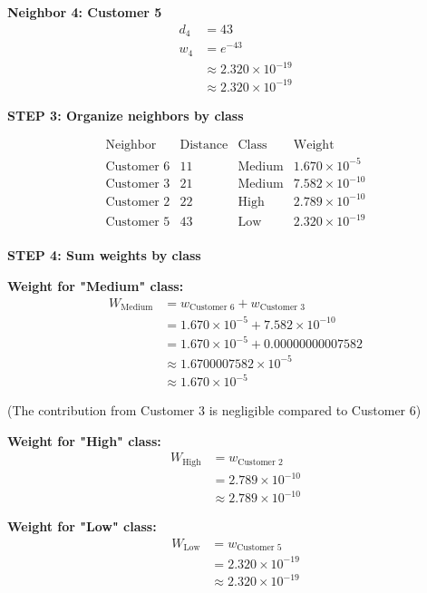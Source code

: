 \documentclass[12pt]{article}
\begin{document}
\begin{solution}
\textbf{Neighbor 4: Customer 5}
\begin{align*}
d_4 &= 43 \\
w_4 &= e^{-43} \\
&\approx 2.320 \times 10^{-19} \\
&\approx \boxed{2.320 \times 10^{-19}}
\end{align*}

\textbf{STEP 3: Organize neighbors by class}

\[
\begin{array}{c|c|c|c}
\text{Neighbor} & \text{Distance} & \text{Class} & \text{Weight} \\
\hline
\text{Customer 6} & 11 & \text{Medium} & 1.670 \times 10^{-5} \\
\text{Customer 3} & 21 & \text{Medium} & 7.582 \times 10^{-10} \\
\text{Customer 2} & 22 & \text{High} & 2.789 \times 10^{-10} \\
\text{Customer 5} & 43 & \text{Low} & 2.320 \times 10^{-19} \\
\end{array}
\]

\textbf{STEP 4: Sum weights by class}

\textbf{Weight for "Medium" class:}
\begin{align*}
W_{\text{Medium}} &= w_{\text{Customer 6}} + w_{\text{Customer 3}} \\
&= 1.670 \times 10^{-5} + 7.582 \times 10^{-10} \\
&= 1.670 \times 10^{-5} + 0.00000000007582 \\
&\approx 1.6700007582 \times 10^{-5} \\
&\approx \boxed{1.670 \times 10^{-5}}
\end{align*}

(The contribution from Customer 3 is negligible compared to Customer 6)

\textbf{Weight for "High" class:}
\begin{align*}
W_{\text{High}} &= w_{\text{Customer 2}} \\
&= 2.789 \times 10^{-10} \\
&\approx \boxed{2.789 \times 10^{-10}}
\end{align*}

\textbf{Weight for "Low" class:}
\begin{align*}
W_{\text{Low}} &= w_{\text{Customer 5}} \\
&= 2.320 \times 10^{-19} \\
&\approx \boxed{2.320 \times 10^{-19}}
\end{align*}


\end{solution}
\end{document}

